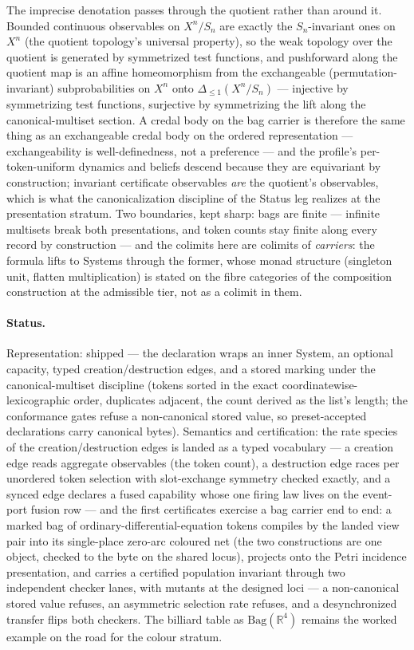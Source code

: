 The imprecise denotation passes through the quotient rather than
around it. Bounded continuous observables on $X^n/S_n$ are exactly
the $S_n$-invariant ones on $X^n$ (the quotient topology's universal
property), so the weak topology over the quotient is generated by
symmetrized test functions, and pushforward along the quotient map
is an affine homeomorphism from the exchangeable
(permutation-invariant) subprobabilities on $X^n$ onto
$\Delta_{\le 1}(X^n/S_n)$ --- injective by symmetrizing test
functions, surjective by symmetrizing the lift along the
canonical-multiset section. A credal body on the bag carrier
is therefore the same thing as an exchangeable credal body on
the ordered representation --- exchangeability is well-definedness,
not a preference --- and the profile's per-token-uniform dynamics
and beliefs descend because they are equivariant by construction;
invariant certificate observables \emph{are} the quotient's
observables, which is what the canonicalization discipline of the
Status leg realizes at the presentation stratum. Two boundaries,
kept sharp: bags are finite --- infinite multisets break both
presentations, and token counts stay finite along every record by
construction --- and the colimits here are colimits of
\emph{carriers}: the formula lifts to Systems through the former,
whose monad structure (singleton unit, flatten multiplication) is
stated on the fibre categories of the composition construction at the
admissible tier, not as a colimit in them.

\paragraph{Status.} Representation: shipped --- the declaration
wraps an inner System, an optional capacity, typed
creation/destruction edges, and a stored marking under the
canonical-multiset discipline (tokens sorted in the exact
coordinatewise-lexicographic order, duplicates adjacent, the count
derived as the list's length; the conformance gates refuse a
non-canonical stored value, so preset-accepted declarations carry
canonical bytes). Semantics and certification: the rate species of
the creation/destruction edges is landed as a typed vocabulary --- a
creation edge reads aggregate observables (the token count), a
destruction edge races per unordered token selection with
slot-exchange symmetry checked exactly, and a synced edge declares a
fused capability whose one firing law lives on the
event-port fusion row --- and the first certificates exercise a bag
carrier end to end: a marked bag of ordinary-differential-equation
tokens compiles by the landed view pair into its single-place
zero-arc coloured net (the two constructions are one object, checked
to the byte on the shared locus), projects onto the Petri incidence
presentation, and carries a certified population invariant through
two independent checker lanes, with mutants at the designed loci ---
a non-canonical stored value refuses, an asymmetric selection rate
refuses, and a desynchronized transfer flips both checkers. The
billiard table as $\mathrm{Bag}(\mathbb{R}^4)$ remains the worked
example on the road for the colour stratum.

